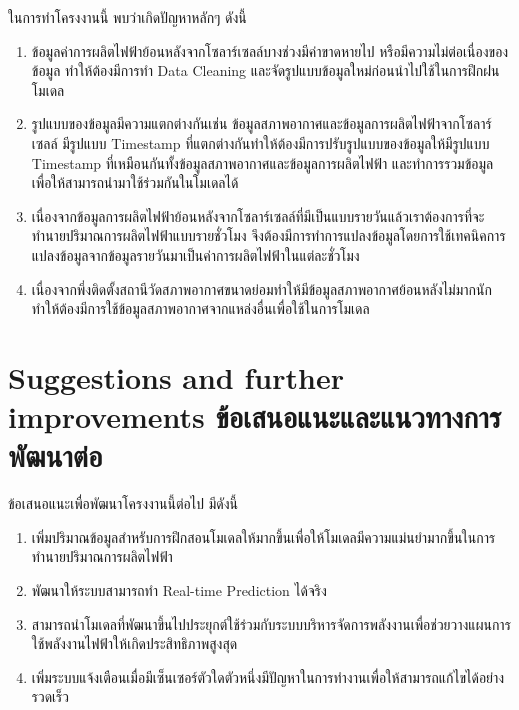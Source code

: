 ในการทำโครงงานนี้ พบว่าเกิดปัญหาหลักๆ ดังนี้

\begin{enumerate}
        \item ข้อมูลค่าการผลิตไฟฟ้าย้อนหลังจากโซลาร์เซลล์บางช่วงมีค่าขาดหายไป หรือมีความไม่ต่อเนื่องของข้อมูล ทำให้ต้องมีการทำ Data Cleaning และจัดรูปแบบข้อมูลใหม่ก่อนนำไปใช้ในการฝึกฝนโมเดล
        \item รูปแบบของข้อมูลมีความแตกต่างกันเช่น ข้อมูลสภาพอากาศและข้อมูลการผลิตไฟฟ้าจากโซลาร์เซลล์ มีรูปแบบ Timestamp ที่แตกต่างกันทำให้ต้องมีการปรับรูปแบบของข้อมูลให้มีรูปแบบ Timestamp ที่เหมือนกันทั้งข้อมูลสภาพอากาศและข้อมูลการผลิตไฟฟ้า และทำการรวมข้อมูลเพื่อให้สามารถนำมาใช้ร่วมกันในโมเดลได้
        \item เนื่องจากข้อมูลการผลิตไฟฟ้าย้อนหลังจากโซลาร์เซลล์ที่มีเป็นแบบรายวันแล้วเราต้องการที่จะทำนายปริมาณการผลิตไฟฟ้าแบบรายชั่วโมง จึงต้องมีการทำการแปลงข้อมูลโดยการใช้เทคนิคการแปลงข้อมูลจากข้อมูลรายวันมาเป็นค่าการผลิตไฟฟ้าในแต่ละชั่วโมง
        \item เนื่องจากพึ่งติดตั้งสถานีวัดสภาพอากาศขนาดย่อมทำให้มีข้อมูลสภาพอากาศย้อนหลังไม่มากนัก ทำให้ต้องมีการใช้ข้อมูลสภาพอากาศจากแหล่งอื่นเพื่อใช้ในการโมเดล
\end{enumerate}   


\section{\ifenglish%
Suggestions and further improvements
\else%
ข้อเสนอแนะและแนวทางการพัฒนาต่อ
\fi
}

ข้อเสนอแนะเพื่อพัฒนาโครงงานนี้ต่อไป มีดังนี้

\begin{enumerate}
        \item เพิ่มปริมาณข้อมูลสำหรับการฝึกสอนโมเดลให้มากขึ้นเพื่อให้โมเดลมีความแม่นยำมากขึ้นในการทำนายปริมาณการผลิตไฟฟ้า
        \item พัฒนาให้ระบบสามารถทำ Real-time Prediction ได้จริง
        \item สามารถนำโมเดลที่พัฒนาขึ้นไปประยุกต์ใช้ร่วมกับระบบบริหารจัดการพลังงานเพื่อช่วยวางแผนการใช้พลังงานไฟฟ้าให้เกิดประสิทธิภาพสูงสุด
        \item เพิ่มระบบแจ้งเตือนเมื่อมีเซ็นเซอร์ตัวใดตัวหนึ่งมีปัญหาในการทำงานเพื่อให้สามารถแก้ไขได้อย่างรวดเร็ว
\end{enumerate}